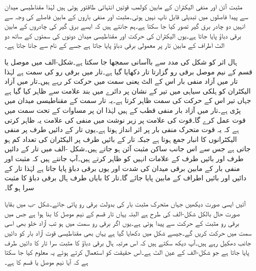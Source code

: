 مثبت آئن اور منفی الیکٹران کے مابین کولمب قوتیں انتہائی طاقتور ہوتی ہیں لہٰذا مقناطیسی میدان سے پیدا فاصلوں میں تبدیلی قابل ناپ نہیں ہوتی۔مثبت اور منفی باروں کے مابین فاصلے کی وجہ سے  انہیں دو چادر برق گیر  تصور کیا جا سکتا ہے۔ہم جانتے ہیں کہ ایسے برق گیر  کی چادروں کے مابین برقی دباؤ پایا جاتا ہے۔یوں الیکٹران کی حرکت اور مقناطیسی میدان دونوں کی سمتوں کے ساتھ  دو الٹ اطراف کے مابین تار پر معمولی برقی دباؤ پایا جاتا ہے جسے  کے نام سے جانا جاتا ہے۔

ہال اثر کو شکل  کی مدد سے باآسانی سمجھا جا سکتا ہے۔شکل-الف میں موصل یا  قسم کے نیم موصل برقی رو گزارتا تار دکھایا گیا ہے۔تار میں برقی رو  کی سمت  ہے  لہٰذا تار میں آزاد منفی بار اس کے الٹ یعنی  سمت  میں حرکت کر رہے ہیں۔تار میں آزاد الیکٹران کو ہلکی سیاہی میں تیر کے نشان پر دائرے میں بند  علامت سے ظاہر کیا گیا ہے جہاں تیر اس کے حرکت کی سمت ظاہر کرتا ہے۔یہ تار  سمت کے مقناطیسی میدان میں پڑی ہے۔تار میں آزاد بار منفی قطب کے ہیں لہٰذا ان پر مساوات  کے تحت  سمت میں قوت  عمل کرے گا۔قوت کی علامت پر زیر نوشت میں منفی کی علامت یہ ظاہر کرتی ہے کہ یہ قوت متحرک منفی بار پر اثر انداز ہوتا ہے۔یوں تار کے دائیں طرف پر منفی الیکٹرانوں کا انبار جمع ہوتا ہے جبکہ تار کے بائیں طرف پر الیکٹران کی تعداد کم ہو جاتی ہے جس سے اس جانب ساکن مثبت آئن  ہو جاتے ہیں۔شکل -الف میں تار کے دائیں طرف  اور بائیں طرف   کے علامات انہیں کو ظاہر کرتے ہیں۔آپ جانتے ہیں کہ مثبت اور  منفی بار  کے مابین برقی میدان کی شدت  اور یوں برقی دباؤ پایا جاتا ہے لہٰذا تار کے دائیں اور بائیں اطراف کے مابین  پایا جائے گا۔تار کا بایاں طرف ہال برقی دباؤ کا مثبت سرا ہو گا۔

آئیں ایسی صورت دیکھیں جہاں متحرک مثبت بار کی بدولت برقی رو پائی جائے۔شکل -ب میں بقایا صورت حال بالکل شکل-الف کی طرح ہے البتہ یہاں تار  قسم کے نیم موصل کا بنا ہوا ہے جس میں برقی رو مثبت  کے حرکت سے پیدا ہوتی ہے۔یوں اگر برقی رو  سمت میں ہو تب آزاد خلو بھی اسی سمت میں حرکت کریں گے۔جیسے شکل میں دکھایا گیا ہے یہاں بھی مقناطیسی قوت آزاد بار کو دائیں جانب دھکیل رہے ہیں۔آپ دیکھ سکتے ہیں کہ اس مرتبہ ہال برقی دباؤ کا مثبت سرا تار کا دائیں طرف پایا جاتا ہے جو شکل-الف کے عین الٹ ہے۔اس حقیقت کو استعمال کرتے ہوئے یہ معلوم کیا جا سکتا ہے کہ آیا  نیم موصل  یا  قسم کا ہے۔

